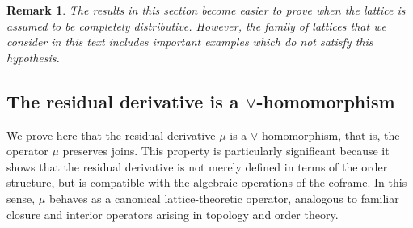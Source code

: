 \documentclass{article}
\newcommand{\blue}{\color{blue}}
\newtheorem{remark}[theorem]{Remark}
\begin{document}

\begin{remark}
    The results in this section become easier to prove when the lattice is assumed to be completely distributive. However, the family of lattices that we consider in this text includes important examples which do not satisfy this hypothesis.
\end{remark}



\subsection{\label{section.residual.derivative.vee.homomorphism}The residual derivative is a $\vee$-homomorphism}

{ 
We prove here that the residual derivative \(\mu\) is a \(\vee\)-homomorphism, that is, the operator \(\mu\) preserves joins. 
This property is particularly significant because it shows that the residual derivative is not merely defined in terms of the order structure, but is compatible with the algebraic operations of the coframe. In this sense, \(\mu\) behaves as a canonical lattice-theoretic operator, analogous to familiar closure and interior operators arising in topology and order theory.}
\end{document}
